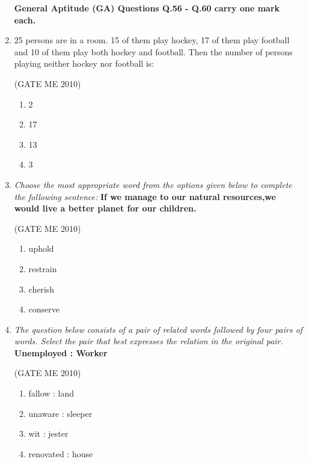 \documentclass[journal,12pt,onecolumn]{IEEEtran}
\theoremstyle{remark}
\begin{document}
\begin{enumerate}
\textbf{General Aptitude (GA) Questions
Q.56 - Q.60 carry one mark each.}\\

\item 25 persons are in a room. 15 of them play hockey, 17 of them play football and 10 of them play both hockey and football. Then the number of persons playing neither hockey nor football is:

\hfill{(GATE  ME 2010)}\\


\begin{multicols}{4}
\begin{enumerate}
\item 2
\item 17
\item 13
\item 3
\end{enumerate}
\end{multicols}



\item \textit{Choose the most appropriate word from the options given below to complete the following sentence:}
\textbf{If we manage to our natural resources,we would live a better planet for our  children.}


\hfill{(GATE  ME 2010)}\\

\begin{multicols}{4}
\begin{enumerate}
\item uphold
\item restrain
\item cherish
\item conserve
\end{enumerate}
\end{multicols}



\item \textit{The question below consists of a pair of related words followed by four pairs of words. Select the pair that best expresses the relation in the original pair.}
\textbf{Unemployed : Worker}

\hfill{(GATE  ME 2010)}\\


\begin{enumerate}
\item fallow : land
\item unaware : sleeper
\item wit : jester
\item renovated : house
\end{enumerate}




\end{enumerate}
\end{document}
